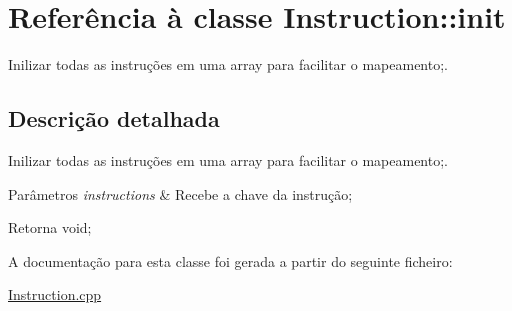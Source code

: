 \hypertarget{class_instruction_1_1init}{}\section{Referência à classe Instruction\+:\+:init}
\label{class_instruction_1_1init}


Inilizar todas as instruções em uma array para facilitar o mapeamento;.  




\subsection{Descrição detalhada}
Inilizar todas as instruções em uma array para facilitar o mapeamento;. 


\begin{DoxyParams}{Parâmetros}
{\em instructions} & Recebe a chave da instrução; \\
\hline
\end{DoxyParams}
\begin{DoxyReturn}{Retorna}
void; 
\end{DoxyReturn}


A documentação para esta classe foi gerada a partir do seguinte ficheiro\+:\begin{DoxyCompactItemize}
\item 
\hyperlink{_instruction_8cpp}{Instruction.\+cpp}\end{DoxyCompactItemize}
